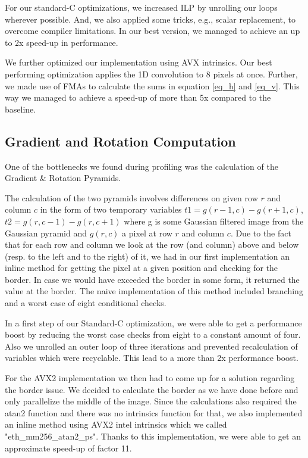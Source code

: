 \documentclass[letterpaper]{article}
\begin{document}
For our standard-C optimizations, we increased ILP by unrolling our loops wherever possible. And, we also applied some tricks, e.g., scalar replacement, to overcome compiler limitations. In our best version, we managed to achieve an up to 2x speed-up in performance.

We further optimized our implementation using AVX intrinsics. Our best performing optimization applies the 1D convolution to 8 pixels at once. Further, we made use of FMAs to calculate the sums in equation \ref{eq_h} and \ref{eq_v}. This way we managed to achieve a speed-up of more than 5x compared to the baseline.


\subsection*{Gradient and Rotation Computation}
One of the bottlenecks we found during profiling was the calculation of the Gradient \& Rotation Pyramids.

The calculation of the two pyramids involves differences on given row $r$ and column $c$ in the form of two temporary variables $t1 = g(r-1,c) - g(r+1, c)$, $t2 = g(r,c-1) - g(r, c+1)$ where g is some Gaussian filtered image from the Gaussian pyramid and $g(r,c)$ a pixel at row $r$ and column $c$.
Due to the fact that for each row and column we look at the row (and column) above and below (resp. to the left and to the right) of it, we had in our first implementation an inline method for getting the pixel at a given position and checking for the border. In case we would have exceeded the border in some form, it returned the value at the border. The naive implementation of this method included branching and a worst case of eight conditional checks.

In a first step of our Standard-C optimization, we were able to get a performance boost by reducing the worst case checks from eight to a constant amount of four. Also we unrolled an outer loop of three iterations and prevented recalculation of variables which were recyclable. This lead to a more than 2x performance boost.

For the AVX2 implementation we then had to come up for a solution regarding the border issue. We decided to calculate the border as we have done before and only parallelize the middle of the image. Since the calculations also required the atan2 function and there was no intrinsics function for that, we also implemented an inline method using AVX2 intel intrinsics which we called "eth\_mm256\_atan2\_ps". Thanks to this implementation, we were able to get an approximate speed-up of factor 11.
\end{document}

